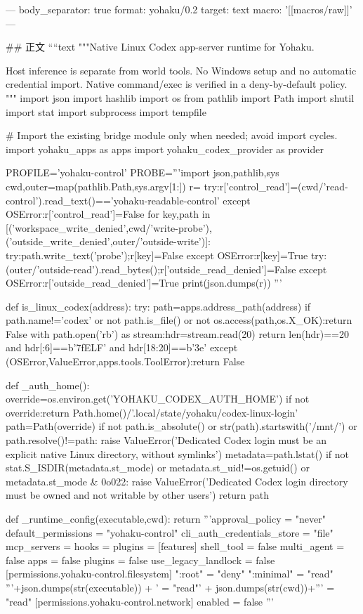 ---
body_separator: true
format: yohaku/0.2
target: text
macro: '[[macros/raw]]'
---

## 正文
````text
"""Native Linux Codex app-server runtime for Yohaku.

Host inference is separate from world tools. No Windows setup and no automatic
credential import. Native command/exec is verified in a deny-by-default policy.
"""
import json
import hashlib
import os
from pathlib import Path
import shutil
import stat
import subprocess
import tempfile

# Import the existing bridge module only when needed; avoid import cycles.
import yohaku_apps as apps
import yohaku_codex_provider as provider

PROFILE='yohaku-control'
PROBE='''import json,pathlib,sys
cwd,outer=map(pathlib.Path,sys.argv[1:])
r={}
try:r['control_read']=(cwd/'read-control').read_text()=='yohaku-readable-control'
except OSError:r['control_read']=False
for key,path in [('workspace_write_denied',cwd/'write-probe'),('outside_write_denied',outer/'outside-write')]:
 try:path.write_text('probe');r[key]=False
 except OSError:r[key]=True
try:(outer/'outside-read').read_bytes();r['outside_read_denied']=False
except OSError:r['outside_read_denied']=True
print(json.dumps(r))
'''


def is_linux_codex(address):
    try:
        path=apps.address_path(address)
        if path.name!='codex' or not path.is_file() or not os.access(path,os.X_OK):return False
        with path.open('rb') as stream:hdr=stream.read(20)
        return len(hdr)==20 and hdr[:6]==b'\x7fELF' and hdr[18:20]==b'\x3e'
    except (OSError,ValueError,apps.tools.ToolError):return False


def _auth_home():
    override=os.environ.get('YOHAKU_CODEX_AUTH_HOME')
    if not override:return Path.home()/'.local/state/yohaku/codex-linux-login'
    path=Path(override)
    if not path.is_absolute() or str(path).startswith('/mnt/') or path.resolve()!=path:
        raise ValueError('Dedicated Codex login must be an explicit native Linux directory, without symlinks')
    metadata=path.lstat()
    if not stat.S_ISDIR(metadata.st_mode) or metadata.st_uid!=os.getuid() or metadata.st_mode & 0o022:
        raise ValueError('Dedicated Codex login directory must be owned and not writable by other users')
    return path


def _runtime_config(executable,cwd):
    return '''approval_policy = "never"
default_permissions = "yohaku-control"
cli_auth_credentials_store = "file"
mcp_servers = {}
hooks = {}
plugins = {}
[features]
shell_tool = false
multi_agent = false
apps = false
plugins = false
use_legacy_landlock = false
[permissions.yohaku-control.filesystem]
":root" = "deny"
":minimal" = "read"
'''+json.dumps(str(executable)) + ' = "read"\n' + json.dumps(str(cwd))+''' = "read"
[permissions.yohaku-control.network]
enabled = false
'''


